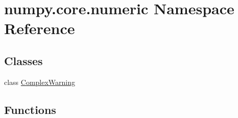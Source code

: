 \hypertarget{namespacenumpy_1_1core_1_1numeric}{}\section{numpy.\+core.\+numeric Namespace Reference}
\label{namespacenumpy_1_1core_1_1numeric}
\subsection*{Classes}
\begin{DoxyCompactItemize}
\item 
class \hyperlink{classnumpy_1_1core_1_1numeric_1_1ComplexWarning}{Complex\+Warning}
\end{DoxyCompactItemize}
\subsection*{Functions}
